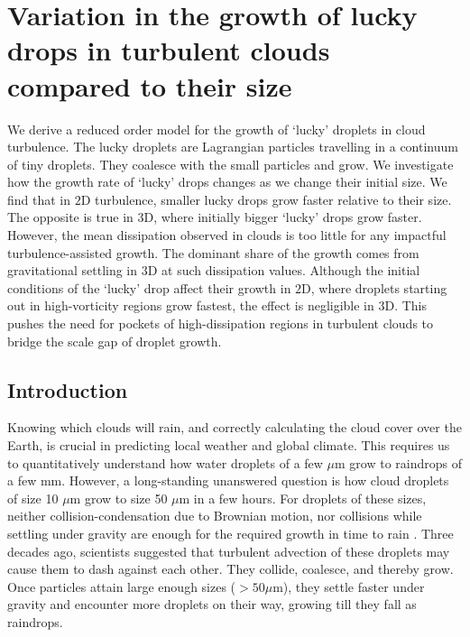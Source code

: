 \documentclass[../Rajarshi-thesis-draft.tex]{subfiles}
\begin{document}
\newcommand{\jin}[1]{j^{\textrm{in}}(#1)}
\newcommand{\jout}[1]{j^{\textrm{out}}(#1)}

\chapter{Variation in the growth of lucky drops in turbulent clouds compared to their size}\label{lck-drp}


\begin{summary}
    We derive a reduced order model for the growth of `lucky' droplets in cloud turbulence. The lucky droplets are Lagrangian particles travelling in a continuum of tiny droplets. They coalesce with the small particles and grow. We investigate how the growth rate of `lucky' drops changes as we change their initial size. We find that in $2$D turbulence, smaller lucky drops grow faster relative to their size. The opposite is true in $3$D, where initially bigger `lucky' drops grow faster. However, the mean dissipation observed in clouds is too little for any impactful turbulence-assisted growth. The dominant share of the growth comes from gravitational settling in $3$D at such dissipation values. Although the initial conditions of the `lucky' drop affect their growth in $2$D, where droplets starting out in high-vorticity regions grow fastest, the effect is negligible in $3$D. This pushes the need for pockets of high-dissipation regions in turbulent clouds to bridge the scale gap of droplet growth.
\end{summary}

\section{Introduction}

Knowing which clouds will rain, and correctly calculating the cloud cover over the Earth, is crucial in predicting local weather and global climate. This requires us to quantitatively understand how water droplets of a few $\mu$m grow to raindrops of a few mm. However, a long-standing unanswered question is how cloud droplets of size 10 $\mu$m grow to size 50 $\mu$m in a few hours. For droplets of these sizes, neither collision-condensation due to Brownian motion, nor collisions while settling under gravity are enough for the required growth in time to rain \cite{grabowski2013}. Three decades ago, scientists suggested that turbulent advection of these droplets may cause them to dash against each other. They collide, coalesce, and thereby grow. Once particles attain large enough sizes ($>50 \mu$m), they settle faster under gravity and encounter more droplets on their way, growing till they fall as raindrops.
\end{document}
